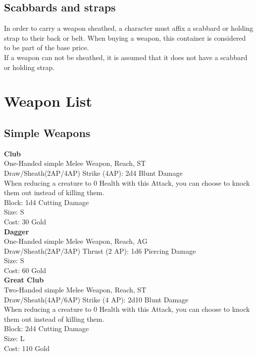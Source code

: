 \subsection{Scabbards and straps}\label{subsec:drawWeapons}
In order to carry a weapon sheathed, a character must affix a scabbard or holding strap to their back or belt.
When buying a weapon, this container is considered to be part of the base price.\\
If a weapon can not be sheathed, it is assumed that it does not have a scabbard or holding strap.

\section{Weapon List}\label{sec:weaponList}
\subsection{Simple Weapons}\label{subsec:simpleWeapons}
\textbf{Club}\label{weapon:club}\\
One-Handed simple Melee Weapon,  Reach, ST\\
Draw/Sheath(2AP/4AP)
Strike (4AP): 2d4 Blunt Damage\\
When reducing a creature to 0 Health with this Attack, you can choose to knock them out instead of killing them.\\
Block: 1d4 Cutting Damage\\
Size: S\\
Cost: 30 Gold\\

\textbf{Dagger}\label{weapon:dagger}\\
One-Handed simple Melee Weapon,  Reach, AG\\
Draw/Sheath(2AP/3AP)
Thrust (2 AP): 1d6 Piercing Damage\\
Size: S\\
Cost: 60 Gold\\

\textbf{Great Club}\label{weapon:greatClub}\\
Two-Handed simple Melee Weapon,  Reach, ST\\
Draw/Sheath(4AP/6AP)
Strike (4 AP): 2d10 Blunt Damage\\
When reducing a creature to 0 Health with this Attack, you can choose to knock them out instead of killing them.\\
Block: 2d4 Cutting Damage\\
Size: L\\
Cost: 110 Gold\\


